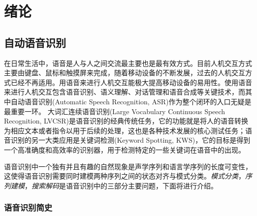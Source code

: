 
\chapter{绪论}
\label{chap:intro0}

\section{自动语音识别}
\label{chap:intro0-asr}


在日常生活中，语音是人与人之间交流最主要也是最有效方式。目前人机交互方式主要由键盘、鼠标和触摸屏来完成，随着移动设备的不断发展，过去的人机交互方式已经不再适用。用语音来进行人机交互能极大提高移动设备的易用性。使用语音来进行人机交互包含语音识别、语义理解、对话管理和语音合成等关键技术，而其中自动语音识别(Automatic Speech Recognition, ASR)作为整个闭环的入口无疑是最重要一环。
大词汇连续语音识别(Large Vocabulary Continuous Speech Recognition, LVCSR)是语音识别的经典传统任务，它的功能就是将人的语音转换为相应文本或者指令以用于后续的处理，这也是各种技术发展的核心测试任务；语音识别的另一大类应用是关键词检测(Keyword Spotting, KWS)，它的目标是得到一个高准确度和高效率的识别器，用于检测特定的一些关键词在语音中的出现。

语音识别中一个独有并且有趣的自然现象是声学序列和语言学序列的长度可变性，这使得语音识别需要同时建模两种序列之间的状态对齐与模式分类。{\em 模式分类}，{\em 序列建模}，{\em 搜索解码}是语音识别中的三部分主要问题，下面将进行介绍。

\subsection{语音识别简史}
\label{chap:intro0-asr-history}

